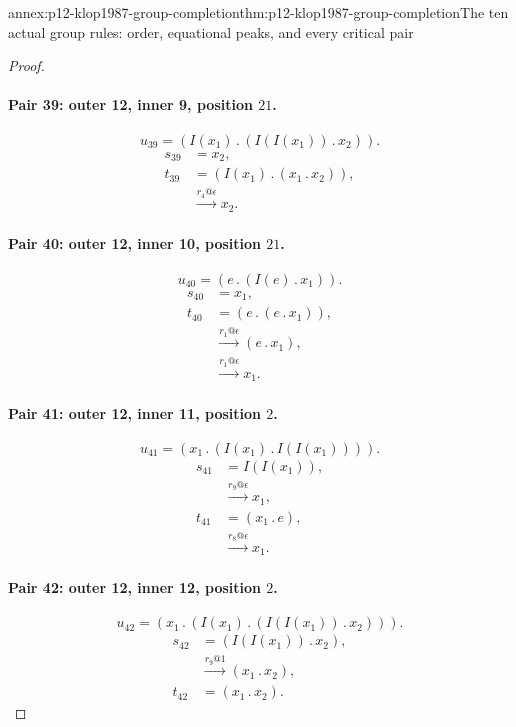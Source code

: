 \begin{annexitem}{annex:p12-klop1987-group-completion}{thm:p12-klop1987-group-completion}{The ten actual group rules: order, equational peaks, and every critical pair}
\begin{proof}
\paragraph{Pair 39: outer 12, inner 9, position \(21\).}
\[
 u_{39}=(I(x_{1})\mathbin{.}(I(I(x_{1}))\mathbin{.}x_{2})).
\]
\begin{align*}
 s_{39}&=x_{2},\\
 t_{39}&=(I(x_{1})\mathbin{.}(x_{1}\mathbin{.}x_{2})),\\
 &\xrightarrow{r_{4}@\epsilon}x_{2}.
\end{align*}

\paragraph{Pair 40: outer 12, inner 10, position \(21\).}
\[
 u_{40}=(e\mathbin{.}(I(e)\mathbin{.}x_{1})).
\]
\begin{align*}
 s_{40}&=x_{1},\\
 t_{40}&=(e\mathbin{.}(e\mathbin{.}x_{1})),\\
 &\xrightarrow{r_{1}@\epsilon}(e\mathbin{.}x_{1}),\\
 &\xrightarrow{r_{1}@\epsilon}x_{1}.
\end{align*}

\paragraph{Pair 41: outer 12, inner 11, position \(2\).}
\[
 u_{41}=(x_{1}\mathbin{.}(I(x_{1})\mathbin{.}I(I(x_{1})))).
\]
\begin{align*}
 s_{41}&=I(I(x_{1})),\\
 &\xrightarrow{r_{9}@\epsilon}x_{1},\\
 t_{41}&=(x_{1}\mathbin{.}e),\\
 &\xrightarrow{r_{8}@\epsilon}x_{1}.
\end{align*}

\paragraph{Pair 42: outer 12, inner 12, position \(2\).}
\[
 u_{42}=(x_{1}\mathbin{.}(I(x_{1})\mathbin{.}(I(I(x_{1}))\mathbin{.}x_{2}))).
\]
\begin{align*}
 s_{42}&=(I(I(x_{1}))\mathbin{.}x_{2}),\\
 &\xrightarrow{r_{9}@1}(x_{1}\mathbin{.}x_{2}),\\
 t_{42}&=(x_{1}\mathbin{.}x_{2}).
\end{align*}


\end{proof}
\end{annexitem}
